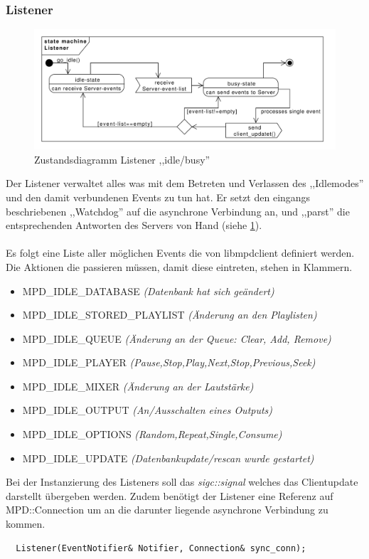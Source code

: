 \newpage
\subsubsection{Listener}
\begin{figure}[htb!]
	\centering
        \includegraphics[width=\textwidth]{./gfx/state/listener}
	\caption{Zustandsdiagramm Listener ,,idle/busy''}
    \label{st_state_listener}
\end{figure}

Der Listener verwaltet alles was mit dem Betreten und Verlassen des ,,Idlemodes'' und den damit verbundenen Events
zu tun hat. Er setzt den eingangs beschriebenen ,,Watchdog'' auf die asynchrone Verbindung an,
und ,,parst'' die entsprechenden Antworten des Servers von Hand (siehe \ref{st_state_listener}). 
\\
\\
Es folgt eine Liste aller möglichen Events die von libmpdclient definiert werden.
Die Aktionen die passieren müssen, damit diese eintreten, stehen in Klammern.
\begin{itemize}
    \item \small MPD\_IDLE\_DATABASE \it(Datenbank hat sich geändert)\rm
    \item \small MPD\_IDLE\_STORED\_PLAYLIST \it(Änderung an den Playlisten)\rm
    \item \small MPD\_IDLE\_QUEUE \it(Änderung an der Queue: Clear, Add, Remove)\rm
    \item \small MPD\_IDLE\_PLAYER \it(Pause,Stop,Play,Next,Stop,Previous,Seek)\rm
    \item \small MPD\_IDLE\_MIXER \it(Änderung an der Lautstärke)\rm
    \item \small MPD\_IDLE\_OUTPUT \it(An/Ausschalten eines Outputs)\rm
    \item \small MPD\_IDLE\_OPTIONS \it(Random,Repeat,Single,Consume)\rm
    \item \small MPD\_IDLE\_UPDATE \it(Datenbankupdate/rescan wurde gestartet)\rm
\end{itemize}
\normalsize
Bei der Instanzierung des Listeners soll das \textit{sigc::signal} welches das Clientupdate darstellt übergeben werden.
Zudem benötigt der Listener eine Referenz auf MPD::Connection um an die darunter liegende asynchrone Verbindung zu kommen.  
\begin{verbatim}
  Listener(EventNotifier& Notifier, Connection& sync_conn);
\end{verbatim}

